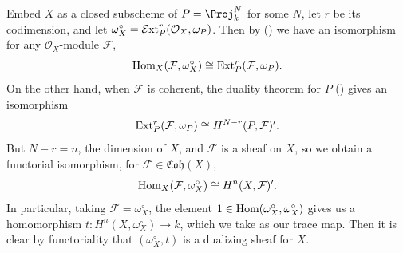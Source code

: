 {\Proof Embed $X$ as a closed subscheme of $P=\Proj_k^N$ for some $N$, let $r$ be its codimension, and let $\omega_X^\circ=\operatorname{\mathcal E xt}_P^r(\mathcal O_X,\omega_P)$. Then by () we have an isomorphism for any $\mathcal O_X$-module $\mathcal F$,
\[
\operatorname{Hom}_X(\mathcal F,\omega_X^\circ)\cong\operatorname{Ext}_P^r(\mathcal F,\omega_P).
\]
\noindent On the other hand, when $\mathcal F$ is coherent, the duality theorem for $P$ () gives an isomorphism
\[
\operatorname{Ext}_P^r(\mathcal F,\omega_P)\cong H^{N-r}(P,\mathcal F)'.
\]
\noindent But $N-r=n$, the dimension of $X$, and $\mathcal F$ is a sheaf on $X$, so we obtain a functorial isomorphism, for $\mathcal F\in\mathfrak{Coh}(X)$,
\[
\operatorname{Hom}_X(\mathcal F,\omega_X^\circ)\cong H^n(X,\mathcal F)'.
\]
\noindent In particular, taking $\mathcal F=\omega_X^\circ$, the element $1\in\operatorname{Hom}(\omega_X^\circ,\omega_X^\circ)$ gives us a homomorphism $t\colon H^n(X,\omega_X^\circ)\to k$, which we take as our trace map. Then it is clear by functoriality that $(\omega_X^\circ,t)$ is a dualizing sheaf for $X$.
}
